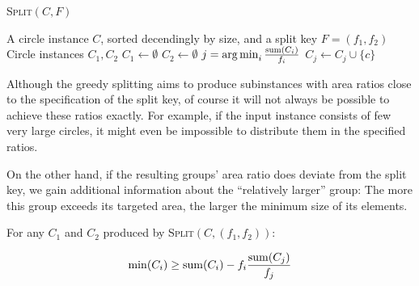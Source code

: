\documentclass[a4paper,style=print,bibliography=totoc,nexus,lnum,extramargin]{tubsbook}
\begin{document}
\begin{algorithm}
    \caption{\textsc{Split}$(C,F)$}
    \label{alg:split}
    \begin{algorithmic}
        \Require A circle instance $C$, sorted decendingly by size, and a split key $F = (f_1, f_2)$
        \Ensure Circle instances $C_1, C_2$
        \State $C_1 \gets \emptyset$
        \State $C_2 \gets \emptyset$
            \State $j = \operatorname*{arg\,min}_{i} \frac{\operatorname{sum}(C_i)}{f_i}$
            \State $C_j \gets C_j \cup \{c\}$
        \EndFor
    \end{algorithmic}
\end{algorithm}

Although the greedy splitting aims to produce subinstances with area ratios close to the specification of the split key, of course it will not always be possible to achieve these ratios exactly. For example, if the input instance consists of few very large circles, it might even be impossible to distribute them in the specified ratios.

On the other hand, if the resulting groups' area ratio does deviate from the split key, we gain additional information about the “relatively larger” group: The more this group exceeds its targeted area, the larger the minimum size of its elements.

\begin{lemma}\label{th:min1}

    For any $C_1$ and $C_2$ produced by \textsc{Split}$(C,(f_1,f_2))$:

    $$\min(C_i) \ge \operatorname{sum}(C_i) - f_i\frac{\operatorname{sum}(C_j)}{f_j}$$


\end{lemma}
\end{document}
